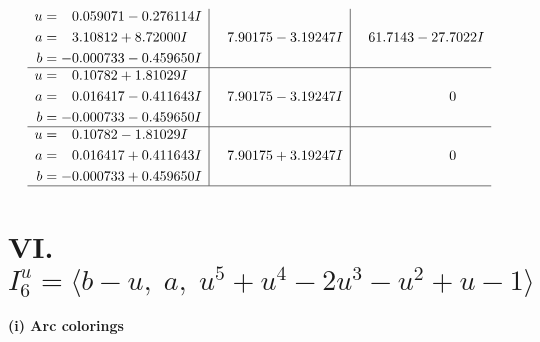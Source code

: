 \documentclass[1p]{elsarticle_modified}
\theoremstyle{definition}
\begin{document}
$$\begin{array}{c|c|c}
\begin{aligned}
u &= \phantom{-}0.059071 - 0.276114 I \\
a &= \phantom{-}3.10812 + 8.72000 I \\
b &= -0.000733 - 0.459650 I\end{aligned}
 & \phantom{-}7.90175 - 3.19247 I & \phantom{-}61.7143 - 27.7022 I \\ \hline\begin{aligned}
u &= \phantom{-}0.10782 + 1.81029 I \\
a &= \phantom{-}0.016417 - 0.411643 I \\
b &= -0.000733 - 0.459650 I\end{aligned}
 & \phantom{-}7.90175 - 3.19247 I & \phantom{-0.000000 } 0 \\ \hline\begin{aligned}
u &= \phantom{-}0.10782 - 1.81029 I \\
a &= \phantom{-}0.016417 + 0.411643 I \\
b &= -0.000733 + 0.459650 I\end{aligned}
 & \phantom{-}7.90175 + 3.19247 I & \phantom{-0.000000 } 0\\
 \hline 
 \end{array}$$\newpage\newpage\renewcommand{\arraystretch}{1}
\centering \section*{VI. $I^u_{6}= \langle b- u,\;a,\;u^5+u^4-2 u^3- u^2+u-1 \rangle$}
\flushleft \textbf{(i) Arc colorings}\\
\end{document}
